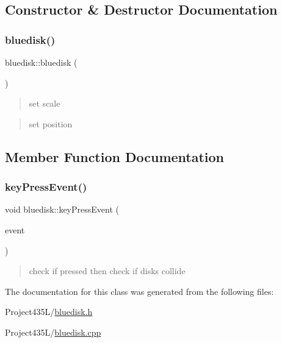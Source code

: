 \subsection{Constructor \& Destructor Documentation}
\mbox{\label{classbluedisk_a4c25a42bc9ca6b380b918da7263be78a}} 
\subsubsection{\texorpdfstring{bluedisk()}{bluedisk()}}
{\footnotesize\ttfamily bluedisk\+::bluedisk (\begin{DoxyParamCaption}{ }\end{DoxyParamCaption})}

\begin{quote}
set scale \end{quote}


\begin{quote}
set position \end{quote}


\subsection{Member Function Documentation}
\mbox{\label{classbluedisk_a813b7b37630ef6ae56feb3cf10519b7b}} 
\subsubsection{\texorpdfstring{key\+Press\+Event()}{keyPressEvent()}}
{\footnotesize\ttfamily void bluedisk\+::key\+Press\+Event (\begin{DoxyParamCaption}\item[{Q\+Key\+Event $\ast$}]{event }\end{DoxyParamCaption})\hspace{0.3cm}{\ttfamily [inline]}}

\begin{quote}
check if pressed then check if disks collide \end{quote}


The documentation for this class was generated from the following files\+:\begin{DoxyCompactItemize}
\item 
Project435\+L/\hyperlink{bluedisk_8h}{bluedisk.\+h}\item 
Project435\+L/\hyperlink{bluedisk_8cpp}{bluedisk.\+cpp}\end{DoxyCompactItemize}
